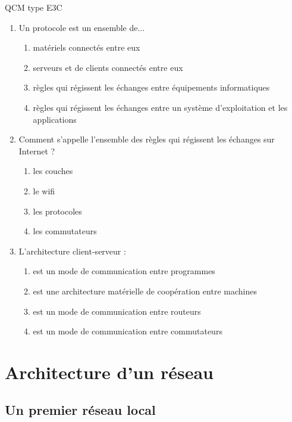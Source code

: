 \documentclass[a4paper,dvipsnames]{article}
\begin{document}
\smallskip

\begin{exercice}{QCM type E3C}{}
 \begin{enumerate}
   \item Un protocole est un ensemble de...
     \begin{enumerate}
       \item matériels connectés entre eux
       \item serveurs et de clients connectés entre eux
       \item règles qui régissent les échanges entre équipements informatiques
       \item règles qui régissent les échanges entre un système d'exploitation et les applications
     \end{enumerate}
   \item Comment s'appelle l'ensemble des règles qui régissent les échanges sur Internet ?
     \begin{enumerate}
       \item les couches
       \item le wifi
       \item les protocoles
       \item les commutateurs
     \end{enumerate}
   \item L'architecture client-serveur :
     \begin{enumerate}
       \item est un mode de communication entre programmes
       \item est une architecture matérielle de coopération entre machines
       \item est un mode de communication entre routeurs
       \item est un mode de communication entre commutateurs
     \end{enumerate}
 \end{enumerate} 
\end{exercice}

\pagebreak

\section{Architecture d'un réseau}

\subsection{Un premier réseau local}
\end{document}
